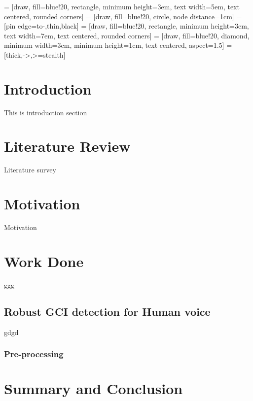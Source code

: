 \documentclass[times, 11pt, a4paper]{article}
\begin{document}

\thispagestyle{empty}
\newpage
\thispagestyle{empty}
\tableofcontents
\newpage
\setcounter{page}{1}

 = [draw, fill=blue!20, rectangle, 
    minimum height=3em, text width=5em, text centered, rounded corners]
 = [draw, fill=blue!20, circle, node distance=1cm]
	 = [pin edge={to-,thin,black}]
 = [draw, fill=blue!20, rectangle, 
    minimum height=3em, text width=7em, text centered, rounded corners]
 = [draw, fill=blue!20, diamond, 
    minimum width=3cm, minimum height=1cm, text centered, aspect=1.5]
 = [thick,->,>=stealth]    


\section{Introduction} \label{Introduction}
This is introduction section

\section{Literature Review}
Literature survey



\section{Motivation}
Motivation


\section{Work Done}
ggg 
\subsection{Robust GCI detection for Human voice}
gdgd

\subsubsection{Pre-processing}

\section{Summary and Conclusion}
\end{document}
